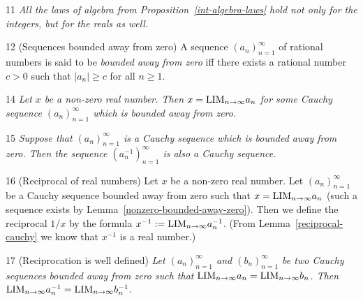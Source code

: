 \begin{proposition}{11}
    \label{real-algebra-laws}
    \emph{All the laws of algebra from Proposition~\ref{int-algebra-laws} hold not only for the integers,
    but for the reals as well.}
\end{proposition}

\begin{definition}{12}
    \label{bounded-away-zero}
    (Sequences bounded away from zero) A sequence $(a_n)_{n=1}^{\infty}$ of rational
    numbers is said to be \emph{bounded away from zero} iff there exists a rational
    number $c > 0$ such that $|a_n| \geq c$ for all $n \geq 1$.
\end{definition}

\begin{lemma}{14}
    \label{nonzero-bounded-away-zero}
    \emph{Let $x$ be a non-zero real number. Then $x = \text{LIM}_{n \rightarrow \infty}{a_n}$ for
    some Cauchy sequence $(a_n)_{n=1}^{\infty}$ which is bounded away from zero.}
\end{lemma}

\begin{lemma}{15}
    \label{reciprocal-cauchy}
    \emph{Suppose that $(a_n)_{n=1}^{\infty}$ is a Cauchy sequence which is bounded
    away from zero. Then the sequence $(a_n^{-1})_{n=1}^{\infty}$ is also a Cauchy
    sequence.}
\end{lemma}

\begin{definition}{16}
    \label{real-reciprocal}
    (Reciprocal of real numbers) Let $x$ be a non-zero real number. Let $(a_n)_{n=1}^{\infty}$
    be a Cauchy sequence bounded away from zero such that $x = \text{LIM}_{n \rightarrow \infty}{a_n}$
    (such a sequence exists by Lemma~\ref{nonzero-bounded-away-zero}). Then we define the reciprocal $1/x$
    by the formula $x^{-1} := \text{LIM}_{n \rightarrow \infty}{a_n^{-1}}$. (From Lemma~\ref{reciprocal-cauchy} we know that
    $x^{-1}$ is a real number.)
\end{definition}

\begin{lemma}{17}
    \label{real-reciprocal-well-defined}
    (Reciprocation is well defined) \emph{Let $(a_n)_{n=1}^{\infty}$ and $(b_n)_{n=1}^{\infty}$
    be two Cauchy sequences bounded away from zero such that $\text{LIM}_{n \rightarrow \infty}{a_n} = \text{LIM}_{n \rightarrow \infty}{b_n}$.
    Then $\text{LIM}_{n \rightarrow \infty}{a_n^{-1}} = \text{LIM}_{n \rightarrow \infty}{b_n^{-1}}$.}
\end{lemma}

